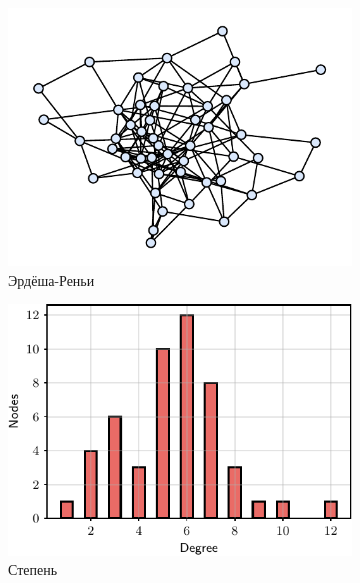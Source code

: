 \begin{figure}[t]
    \centering
    \begin{subfigure}[b]{0.24\textwidth}
    \includegraphics[width=\textwidth]{images/graph_1}
    \caption{Эрдёша-Реньи}
    \end{subfigure}
    \begin{subfigure}[b]{0.24\textwidth}
    \includegraphics[width=\textwidth]{images/graph_1_degree}
    \caption{Степень}
    \end{subfigure}
    \begin{subfigure}[b]{0.24\textwidth}

\end{subfigure}
\end{figure}
